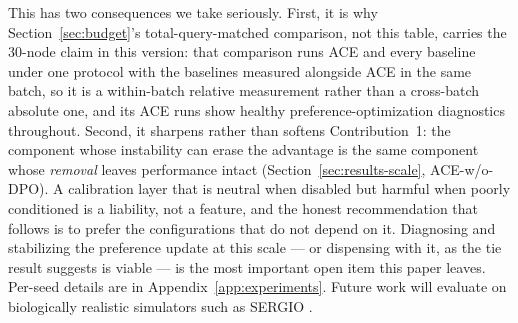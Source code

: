 \documentclass{article}
\theoremstyle{plain}
\theoremstyle{definition}
\theoremstyle{remark}
\begin{document}
This has two consequences we take seriously. First, it is why Section~\ref{sec:budget}'s total-query-matched comparison, not this table, carries the 30-node claim in this version: that comparison runs ACE and every baseline under one protocol with the baselines measured alongside ACE in the same batch, so it is a within-batch relative measurement rather than a cross-batch absolute one, and its ACE runs show healthy preference-optimization diagnostics throughout. Second, it sharpens rather than softens Contribution~1: the component whose instability can erase the advantage is the same component whose \emph{removal} leaves performance intact (Section~\ref{sec:results-scale}, ACE-w/o-DPO). A calibration layer that is neutral when disabled but harmful when poorly conditioned is a liability, not a feature, and the honest recommendation that follows is to prefer the configurations that do not depend on it. Diagnosing and stabilizing the preference update at this scale --- or dispensing with it, as the tie result suggests is viable --- is the most important open item this paper leaves. Per-seed details are in Appendix~\ref{app:experiments}. Future work will evaluate on biologically realistic simulators such as SERGIO \citep{dibaeinia2020sergio}.
\end{document}
